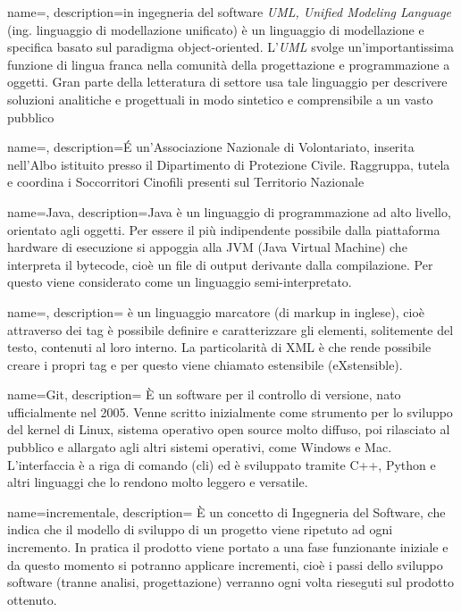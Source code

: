 {
  name=, 
  description={in ingegneria del software \emph{UML, Unified Modeling Language} (ing. linguaggio di modellazione
    unificato) è un linguaggio di modellazione e specifica basato sul paradigma object-oriented. L'\emph{UML} svolge un'importantissima
    funzione di lingua franca nella comunità della progettazione e programmazione a oggetti. Gran parte della letteratura di settore usa
    tale linguaggio per descrivere soluzioni analitiche e progettuali in modo sintetico e comprensibile a un vasto pubblico}
}

{
  name=, 
  description={É un'Associazione Nazionale di Volontariato,
    inserita nell'Albo istituito presso il Dipartimento di Protezione Civile. Raggruppa, tutela e coordina i Soccorritori Cinofili presenti
    sul Territorio Nazionale}
}

{
  name=Java, 
  description={Java è un linguaggio di programmazione ad alto livello, orientato agli oggetti. Per essere il più indipendente
    possibile dalla piattaforma hardware di esecuzione si appoggia alla JVM (Java Virtual Machine) che interpreta il bytecode, cioè un file di
    output derivante dalla compilazione. Per questo viene considerato come un linguaggio semi-interpretato.
  }
}

{
  name=,
  description={ è un linguaggio marcatore (di markup in inglese), cioè attraverso dei tag è possibile definire e caratterizzare gli elementi,
  solitemente del testo, contenuti al loro interno. La particolarità di XML è che rende possibile creare i propri tag e per questo viene
  chiamato estensibile (eXstensible). }
}

{
  name=Git,
  description={ È un software per il controllo di versione, nato ufficialmente nel 2005. Venne scritto inizialmente come strumento per lo
  sviluppo del kernel di Linux, sistema operativo open source molto diffuso, poi rilasciato al pubblico e allargato agli altri sistemi
  operativi, come Windows e Mac. L'interfaccia è a riga di comando (\gls{cli}) ed è sviluppato tramite C++, Python e altri linguaggi che lo
  rendono molto leggero e versatile. }
}

{
  name=incrementale,
  description={ È un concetto di Ingegneria del Software, che indica che il modello di sviluppo di un progetto viene ripetuto ad ogni
  incremento. In pratica il prodotto viene portato a una fase funzionante iniziale e da questo momento si potranno applicare incrementi,
  cioè i passi dello sviluppo software (tranne analisi, progettazione) verranno ogni volta rieseguti sul prodotto ottenuto. }
}

